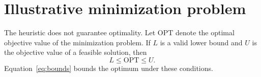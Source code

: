 \documentclass{article}
\newcommand{\OPT}{\mathrm{OPT}}
\begin{document}
\section{Illustrative minimization problem}
The heuristic does not guarantee optimality.
Let $\OPT$ denote the optimal objective value of the minimization problem.
If $L$ is a valid lower bound and $U$ is the objective value of a feasible solution, then
\begin{equation}
L \le \OPT \le U.
\label{eq:bounds}
\end{equation}
Equation~\eqref{eq:bounds} bounds the optimum under these conditions.
\end{document}
